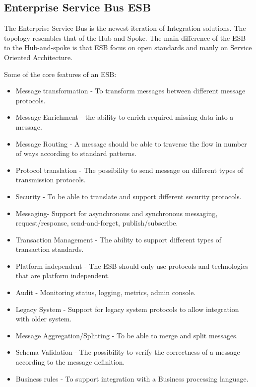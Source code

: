 \documentclass{llncs}
\begin{document}
\subsection{Enterprise Service Bus ESB}
The Enterprise Service Bus is the newest iteration of Integration solutions. The topology resembles that of the Hub-and-Spoke. The main difference of the ESB to the Hub-and-spoke is that ESB focus on open standards and manly on Service Oriented Architecture.

Some of the core features of an ESB:
\begin{itemize}
\item Message transformation - To transform messages between different message protocols.
\item Message Enrichment - the ability to enrich required missing data into a message.
\item Message Routing - A message should be able to traverse the flow in number of ways according to standard patterns.
\item Protocol translation - The possibility to send message on different types of transmission protocols.
\item Security - To be able to translate and support different security protocols.
\item Messaging- Support for asynchronous and synchronous messaging, request/response, send-and-forget, publish/subscribe.
\item Transaction Management - The ability to support different types of transaction standards.
\item Platform independent - The ESB should only use protocols and technologies that are platform independent.
\item Audit - Monitoring status, logging, metrics, admin console.
\item Legacy System - Support for legacy system protocols to allow integration with older system.
\item Message Aggregation/Splitting - To be able to merge and split messages.
\item Schema Validation - The possibility to verify the correctness of a message according to the message definition.
\item Business rules - To support integration with a Business processing language.
\end{itemize}
\end{document}
